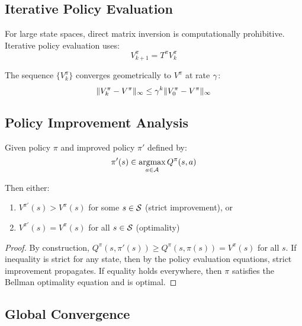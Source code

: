 \subsection{Iterative Policy Evaluation}

For large state spaces, direct matrix inversion is computationally prohibitive. Iterative policy evaluation uses:
\begin{equation}
V_{k+1}^\pi = T^\pi V_k^\pi
\end{equation}

\begin{theorem}
The sequence $\{V_k^\pi\}$ converges geometrically to $V^\pi$ at rate $\gamma$:
\begin{equation}
\|V_k^\pi - V^\pi\|_\infty \leq \gamma^k \|V_0^\pi - V^\pi\|_\infty
\end{equation}
\end{theorem}

\subsection{Policy Improvement Analysis}

\begin{theorem}
Given policy $\pi$ and improved policy $\pi'$ defined by:
\begin{equation}
\pi'(s) \in \operatorname*{argmax}_{a \in \mathcal{A}} Q^\pi(s,a)
\end{equation}

Then either:
\begin{enumerate}
    \item $V^{\pi'}(s) > V^\pi(s)$ for some $s \in \mathcal{S}$ (strict improvement), or
    \item $V^{\pi'}(s) = V^\pi(s)$ for all $s \in \mathcal{S}$ (optimality)
\end{enumerate}
\end{theorem}

\begin{proof}
By construction, $Q^\pi(s, \pi'(s)) \geq Q^\pi(s, \pi(s)) = V^\pi(s)$ for all $s$. If inequality is strict for any state, then by the policy evaluation equations, strict improvement propagates. If equality holds everywhere, then $\pi$ satisfies the Bellman optimality equation and is optimal.
\end{proof}

\subsection{Global Convergence}

